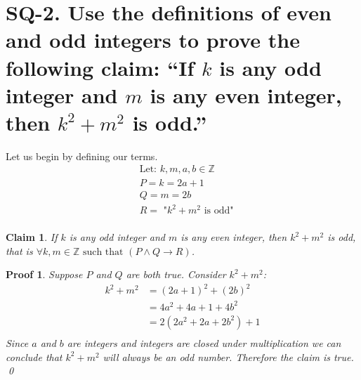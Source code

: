 \documentclass{article}
\newtheorem*{claim}{Claim}
\newtheorem*{myproof}{Proof}
\begin{document}
\section*{SQ-2. Use the definitions of even and odd integers to prove the following claim: “If $k$ is any odd integer and $m$ is any even integer, then $k^2+m^2$ is odd.” }
Let us begin by defining our terms.
\begin{align*}
    &\text{Let: } k,m,a,b\in\mathbb{Z} \\
    &P = k = 2a+1 \\
    &Q = m = 2b \\
    &R = \text{ "$k^2+m^2$ is odd"} \\
\end{align*}
\begin{claim}
    If $k$ is any odd integer and $m$ is any even integer, then $k^2+m^2$ is odd, that is $\forall k,m \in \mathbb{Z} \text{ such that } (P \wedge Q \rightarrow R)$.
\end{claim}
\begin{myproof}
    Suppose $P$ and $Q$ are both true. Consider $k^2+m^2$:
    \begin{align*}
        k^2 + m^2 &= (2a+1)^2+(2b)^2 \\
        &= 4a^2+4a+1+4b^2 \\
        &= 2(2a^2+2a+2b^2)+1 \\
    \end{align*}
    Since $a$ and $b$ are integers and integers are closed under multiplication we can conclude that $k^2 + m^2$ will always be an odd number. Therefore the claim is true. \\ 
    \qed
\end{myproof}
\end{document}

